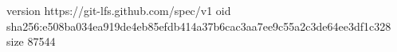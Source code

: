 version https://git-lfs.github.com/spec/v1
oid sha256:e508ba034ea919de4eb85efdb414a37b6cac3aa7ee9c55a2c3de64ee3df1c328
size 87544
